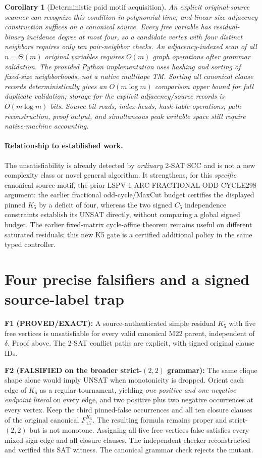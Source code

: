 \documentclass[11pt]{article}
\newtheorem{corollary}{Corollary}
\begin{document}
\begin{corollary}[Deterministic paid motif acquisition]
An explicit original-source scanner can recognize this condition in polynomial time, and linear-size adjacency construction suffices on a canonical source. Every free variable has residual-binary incidence degree at most four, so a candidate vertex with four distinct neighbors requires only ten pair-neighbor checks. An adjacency-indexed scan of all $n=\Theta(m)$ original variables requires $O(m)$ graph operations after grammar validation. The provided Python implementation uses hashing and sorting of fixed-size neighborhoods, not a native multitape TM. Sorting all canonical clause records deterministically gives an $O(m\log m)$ comparison upper bound for full duplicate validation; storage for the explicit adjacency/source records is $O(m\log m)$ bits. Source bit reads, index heads, hash-table operations, path reconstruction, proof output, and simultaneous peak writable space still require native-machine accounting.
\end{corollary}

\paragraph{Relationship to established work.} The unsatisfiability is already detected by \emph{ordinary} 2-SAT SCC and is not a new complexity class or novel general algorithm. It strengthens, for this \emph{specific} canonical source motif, the prior LSPV-1 ARC-FRACTIONAL-ODD-CYCLE298 argument: the earlier fractional odd-cycle/MaxCut budget certifies the displayed pinned $K_5$ by a deficit of four, whereas the two signed $C_5$ independence constraints establish its UNSAT directly, without comparing a global signed budget. The earlier fixed-matrix cycle-affine theorem remains useful on different saturated residuals; this new K5 gate is a certified additional policy in the same typed controller.

\section{Four precise falsifiers and a signed source-label trap}
\noindent\textbf{F1 (PROVED/EXACT):} A source-authenticated simple residual $K_5$ with five free vertices is unsatisfiable for every valid canonical M22 parent, independent of $\delta$. Proof above. The 2-SAT conflict paths are explicit, with signed original clause IDs.

\noindent\textbf{F2 (FALSIFIED on the broader strict-$(2,2)$ grammar):} The same clique shape alone would imply UNSAT when monotonicity is dropped. Orient each edge of $K_5$ as a regular tournament, yielding \emph{one positive and one negative endpoint literal} on every edge, and two positive plus two negative occurrences at every vertex. Keep the third pinned-false occurrences and all ten closure clauses of the original canonical $F_{15}^{K_5}$. The resulting formula remains proper and strict-$(2,2)$ but is not monotone. Assigning all five free vertices false satisfies every mixed-sign edge and all closure clauses. The independent checker reconstructed and verified this SAT witness. The canonical grammar check rejects the mutant.
\end{document}
